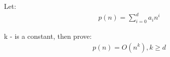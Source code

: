 \documentclass{article}
\begin{document}
    Let:
    \begin{align}
        p(n)= \sum_{i=0}^{d} a_i n^i
    \end{align}

    k - is a constant, then prove:
    \begin{align}
        p(n) = O(n^k), k \geq d
    \end{align}
\end{document}
